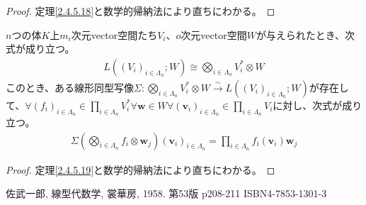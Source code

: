 \documentclass[dvipdfmx]{jsarticle}
\begin{document}
\begin{proof} 定理\ref{2.4.5.18}と数学的帰納法により直ちにわかる。
\end{proof}
\begin{thm}\label{2.4.6.8}
$n$つの体$K$上$m_{i}$次元vector空間たち$V_{i}$、$o$次元vector空間$W$が与えられたとき、次式が成り立つ。
\begin{align*}
L\left( \left( V_{i} \right)_{i \in \varLambda_{n}};W \right) \cong \bigotimes_{i \in \varLambda_{n}} V_{i}^{*} \otimes W
\end{align*}
このとき、ある線形同型写像$\varSigma:\bigotimes_{i \in \varLambda_{n}} V_{i}^{*} \otimes W\overset{\sim}{\rightarrow}L\left( \left( V_{i} \right)_{i \in \varLambda_{n}};W \right)$が存在して、$\forall\left( f_{i} \right)_{i \in \varLambda_{n}} \in \prod_{i \in \varLambda_{n}} V_{i}^{*}\forall\mathbf{w} \in W\forall\left( \mathbf{v}_{i} \right)_{i \in \varLambda_{n}} \in \prod_{i \in \varLambda_{n}} V_{i}$に対し、次式が成り立つ。
\begin{align*}
\varSigma\left( \bigotimes_{i \in \varLambda_{n}} f_{i} \otimes \mathbf{w}_{j} \right)\left( \mathbf{v}_{i} \right)_{i \in \varLambda_{n}} = \prod_{i \in \varLambda_{n}} {f_{i}\left( \mathbf{v}_{i} \right)}\mathbf{w}_{j}
\end{align*}
\end{thm}
\begin{proof} 定理\ref{2.4.5.19}と数学的帰納法により直ちにわかる。
\end{proof}
\begin{thebibliography}{50}
  佐武一郎, 線型代数学, 裳華房, 1958. 第53版 p208-211 ISBN4-7853-1301-3
\end{thebibliography}
\end{document}
